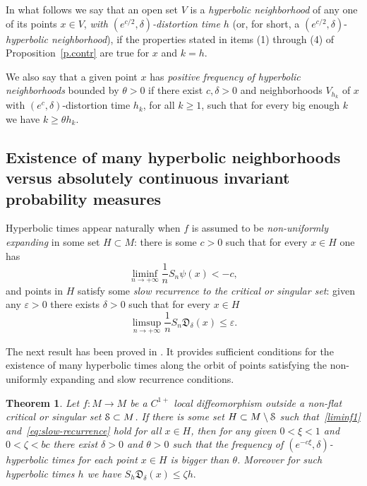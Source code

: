 \documentclass[reqno,12pt,a4paper]{amsart}
\theoremstyle{plain}
\newtheorem{theorem}{Theorem}[section]
\theoremstyle{definition}
\begin{document}
In what follows we say that an open set $V$ is a
\emph{hyperbolic neighborhood} of any one of its points
$x\in V$, \emph{with $(e^{c/2},\delta)$-distortion time
  $h$} (or, for short, a
$(e^{c/2},\delta)$-\emph{hyperbolic neighborhood}), if
the properties stated in items (1) through (4) of
Proposition~\ref{p.contr} are true for $x$ and $k=h$.

We also say that a given point $x$ has \emph{positive
  frequency of hyperbolic neighborhoods} bounded by
$\theta>0$ if there exist $c,\delta>0$ and
neighborhoods $V_{h_k}$ of $x$ with
$(e^{c},\delta)$-distortion time $h_k$, for all $k\ge1$,
such that for every big enough $k$ we have $k\ge\theta h_k$.

\subsection{Existence of many hyperbolic neighborhoods
  versus absolutely continuous invariant probability
  measures}
\label{sec:existence-hyperb-tim}

Hyperbolic times appear naturally when $f$ is assumed to be
{\em non-uniformly expanding} in some set $H\subset M$:
there is some $c>0$ such that for every $x\in H$ one has
 \begin{equation} \label{liminf1}
\liminf_{n\to +\infty}\frac{1}{n}
S_n\psi(x)<-c,
 \end{equation}
 and points in $H$ satisfy some {\em slow recurrence to the
   critical or singular set}: given any ${\varepsilon}>0$ there
 exists $\delta>0$ such that for every $x\in H$
 \begin{equation}\label{eq:slow-recurrence}
   \limsup_{n\to+\infty} \frac1{n} S_n{{\mathfrak D}}_{\delta}(x)
   \le{\varepsilon}.
\end{equation}

The next result has been proved in \cite[Theorem~C \& Lemma
5.4]{ABV00}. It provides sufficient conditions for the
existence of many hyperbolic times along the orbit of points
satisfying the non-uniformly expanding and slow recurrence
conditions.

\begin{theorem}\label{thm:abv0}
  Let $f: M\to M$ be a $C^{1+}$ local diffeomorphism outside
  a non-flat critical or singular set ${\EuScript{S}}\subset M$. If
  there is some set $H\subset M\setminus{\EuScript{S}}$ such
  that~\eqref{liminf1} and~\eqref{eq:slow-recurrence} hold
  for all $x\in H$, then for any given $0<\xi<1$ and
  $0<\zeta<bc$ there exist $\delta>0$ and $\theta>0$ such
  that the frequency of $(e^{-c\xi},\delta)$-hyperbolic
  times for each point $x\in H$ is bigger than
  $\theta$. Moreover for such hyperbolic times $h$ we have
  $S_h{{\mathfrak D}}_\delta(x) \le \zeta h.$
\end{theorem}
\end{document}
